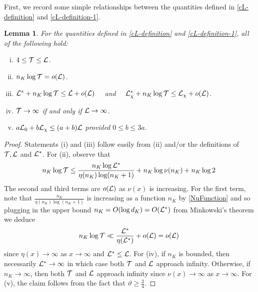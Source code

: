 \documentclass[12pt,psamsfonts]{amsart}
\newtheorem{lem}[thm]{Lemma}
\theoremstyle{definition}
\theoremstyle{remark}
\numberwithin{equation}{section}
\begin{document}
First, we record some simple relationships between the quantities defined in \eqref{cL-definition} and \eqref{cL-definition-1}.
\begin{lem} \label{QuantityRelations} For the quantities defined in \eqref{cL-definition} and \eqref{cL-definition-1}, all of the following hold: 
\begin{enumerate}[(i)]
	\item $4 \leq \mathcal{T} \leq \mathcal{L}$.
	\item $n_K\log \mathcal{T} = o(\mathcal{L})$.
	\item $\mathcal{L}^* + n_K \log \mathcal{T} \leq \mathcal{L} + o(\mathcal{L}) \quad $ and $ \quad \mathcal{L}^*_{\chi} + n_K \log \mathcal{T} \leq \mathcal{L}_{\chi} + o(\mathcal{L})$.
	\item $\mathcal{T} \rightarrow \infty$ if and only if $\mathcal{L} \rightarrow \infty$. 
	\item $a \mathcal{L}_0 + b \mathcal{L}_{\chi} \leq (a+b) \mathcal{L}$ provided $0 \leq b \leq 3a$.
\end{enumerate}
\end{lem}
\begin{proof} Statements (i) and (iii) follow easily from (ii) and/or the definitions  of $\mathcal{T}, \mathcal{L}$ and $\mathcal{L}^*$. For (ii), observe that
\[
n_K\log \mathcal{T} \leq \frac{n_K  \log \mathcal{L}^*}{\eta(n_K) \log (n_K+1)} + n_K \log \nu(n_K) + n_K \log 2 
\]
The second and third terms are $o(\mathcal{L})$ as $\nu(x)$ is increasing. For the first term, note that  $\tfrac{n_K}{\eta(n_K) \log (n_K+1)}$ is increasing as a function $n_K$ by \eqref{NuFunction} and so plugging in the upper bound $n_K = O(\log d_K) = O(\mathcal{L}^*)$ from Minkowski's theorem we deduce
\[
n_K \log \mathcal{T} \ll \frac{\mathcal{L}^*}{\eta(\mathcal{L}^*)} + o(\mathcal{L}) = o(\mathcal{L})
\]
since $\eta(x) \rightarrow \infty$ as $x \rightarrow \infty$ and $\mathcal{L}^* \leq \mathcal{L}$. For (iv), if $n_K$ is bounded, then necessarily $\mathcal{L}^* \rightarrow \infty$ in which case both $\mathcal{T}$ and $\mathcal{L}$ approach infinity. Otherwise, if $n_K \rightarrow \infty$, then both $\mathcal{T}$ and $\mathcal{L}$ approach infinity since $\nu(x) \rightarrow \infty$ as $x \rightarrow \infty$. For (v), the claim follows from the fact that $\vartheta \geq \tfrac{3}{4}$. 
\end{proof}
\end{document}
